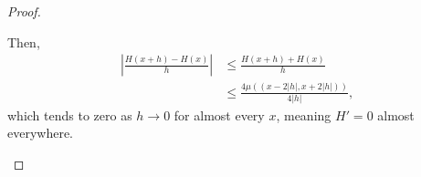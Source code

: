 \documentclass[10pt]{mypackage}
\begin{document}
\begin{proof}
\begin{enumerate}[(a)]
        Then,
        \begin{align*}
          \left\vert \frac{H\left( x+h \right) - H\left( x \right)}{h} \right\vert &\leq \frac{H\left( x+h \right) + H\left( x \right)}{h}\\
                                                                                   &\leq \frac{4\mu\left( \left( x-2\left\vert h \right\vert , x + 2\left\vert h \right\vert\right) \right)}{4\left\vert h \right\vert},
        \end{align*}
        which tends to zero as $h\rightarrow 0$ for almost every $x$, meaning $H' = 0$ almost everywhere.
    \end{enumerate}
  \end{proof}
\end{document}
